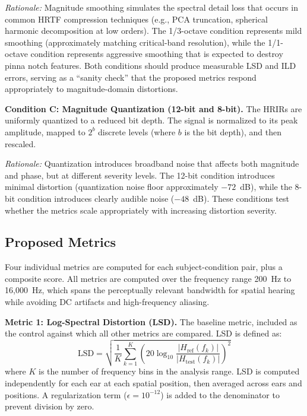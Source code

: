 \documentclass[12pt,a4paper]{article}
\begin{document}
\textit{Rationale:} Magnitude smoothing simulates the spectral detail loss that occurs in common HRTF compression techniques (e.g., PCA truncation, spherical harmonic decomposition at low orders). The 1/3-octave condition represents mild smoothing (approximately matching critical-band resolution), while the 1/1-octave condition represents aggressive smoothing that is expected to destroy pinna notch features. Both conditions should produce measurable LSD and ILD errors, serving as a ``sanity check'' that the proposed metrics respond appropriately to magnitude-domain distortions.

\textbf{Condition C: Magnitude Quantization (12-bit and 8-bit).}
The HRIRs are uniformly quantized to a reduced bit depth. The signal is normalized to its peak amplitude, mapped to $2^b$ discrete levels (where $b$ is the bit depth), and then rescaled.

\textit{Rationale:} Quantization introduces broadband noise that affects both magnitude and phase, but at different severity levels. The 12-bit condition introduces minimal distortion (quantization noise floor approximately $-72$~dB), while the 8-bit condition introduces clearly audible noise ($-48$~dB). These conditions test whether the metrics scale appropriately with increasing distortion severity.

\subsection{Proposed Metrics}

Four individual metrics are computed for each subject-condition pair, plus a composite score. All metrics are computed over the frequency range 200~Hz to 16{,}000~Hz, which spans the perceptually relevant bandwidth for spatial hearing while avoiding DC artifacts and high-frequency aliasing.

\textbf{Metric 1: Log-Spectral Distortion (LSD).}
The baseline metric, included as the control against which all other metrics are compared. LSD is defined as:
\begin{equation}
\mathrm{LSD} = \sqrt{\frac{1}{K} \sum_{k=1}^{K} \left( 20 \log_{10} \frac{|H_{\mathrm{ref}}(f_k)|}{|H_{\mathrm{test}}(f_k)|} \right)^2}
\label{eq:lsd}
\end{equation}
where $K$ is the number of frequency bins in the analysis range. LSD is computed independently for each ear at each spatial position, then averaged across ears and positions. A regularization term ($\epsilon = 10^{-12}$) is added to the denominator to prevent division by zero.
\end{document}

